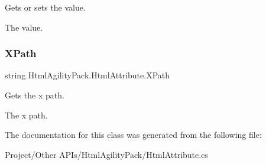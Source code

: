 Gets or sets the value. 

The value.\mbox{\label{class_html_agility_pack_1_1_html_attribute_aba426abd7fa5b54ba4703ee570ab1479}} 
\subsubsection{\texorpdfstring{X\+Path}{XPath}}
{\footnotesize\ttfamily string Html\+Agility\+Pack.\+Html\+Attribute.\+X\+Path\hspace{0.3cm}{\ttfamily [get]}}



Gets the x path. 

The x path.

The documentation for this class was generated from the following file\+:\begin{DoxyCompactItemize}
\item 
Project/\+Other A\+P\+Is/\+Html\+Agility\+Pack/Html\+Attribute.\+cs\end{DoxyCompactItemize}
